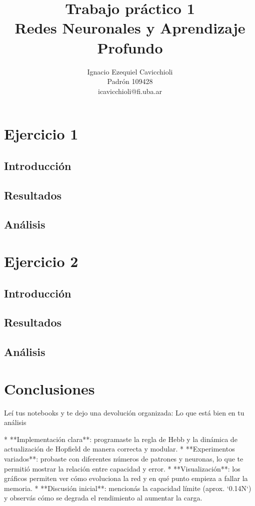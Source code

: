 \documentclass[11pt]{article} %
\title{Trabajo práctico 1\\ Redes Neuronales y Aprendizaje Profundo}
\author{Ignacio Ezequiel Cavicchioli\\Padrón 109428\\icavicchioli@fi.uba.ar}
\date{} %
\begin{document}
\maketitle

\section{Ejercicio 1}

\subsection{Introducción}

\subsection{Resultados}

\subsection{Análisis}

\section{Ejercicio 2}

\subsection{Introducción}

\subsection{Resultados}

\subsection{Análisis}

\section{Conclusiones}

Leí tus notebooks y te dejo una devolución organizada:
Lo que está bien en tu análisis

* **Implementación clara**: programaste la regla de Hebb y la dinámica de actualización de Hopfield de manera correcta y modular.
* **Experimentos variados**: probaste con diferentes números de patrones y neuronas, lo que te permitió mostrar la relación entre capacidad y error.
* **Visualización**: los gráficos permiten ver cómo evoluciona la red y en qué punto empieza a fallar la memoria.
* **Discusión inicial**: mencionás la capacidad límite (aprox. `0.14N`) y observás cómo se degrada el rendimiento al aumentar la carga.
\end{document}
